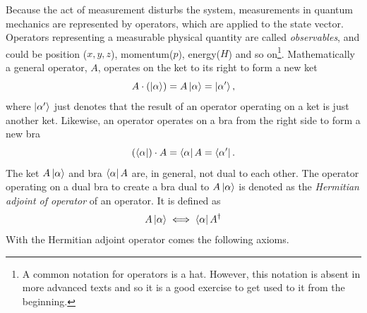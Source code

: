 Because the act of measurement disturbs the system, measurements in quantum mechanics are represented by operators, which are applied to the state vector. Operators representing a measurable physical quantity are called \emph{observables}, and could be position ($x, y,z$), momentum($p$), energy($H$) and so on\footnote{A common notation for operators is a hat. However, this notation is absent in more advanced texts and so it is a good exercise to get used to it from the beginning.}. Mathematically a general operator, $A$, operates on the ket to its right to form a new ket
\begin{equation}
	A\cdot(\ket{\alpha})=A\ket{\alpha}=\ket{\alpha'},
	\label{random}
\end{equation} 
where $\ket{\alpha'}$ just denotes that the result of an operator operating on a ket is just another ket. Likewise, an operator operates on a bra from the right side to form a new bra
\begin{equation}
	(\bra{\alpha})\cdot A=\bra{\alpha}A=\bra{\alpha
		'}.
\end{equation} 
The ket $A\ket{\alpha}$ and bra $\bra{\alpha}A$ are, in general, not dual to each other. The operator operating on a dual bra to create a bra dual to $A\ket{\alpha}$ is denoted as the \emph{Hermitian adjoint of operator} of an operator. It is defined as
\begin{equation}
	A\ket{\alpha}\iff\bra{\alpha}A^\dagger
\end{equation} 
With the Hermitian adjoint operator comes the following axioms.
